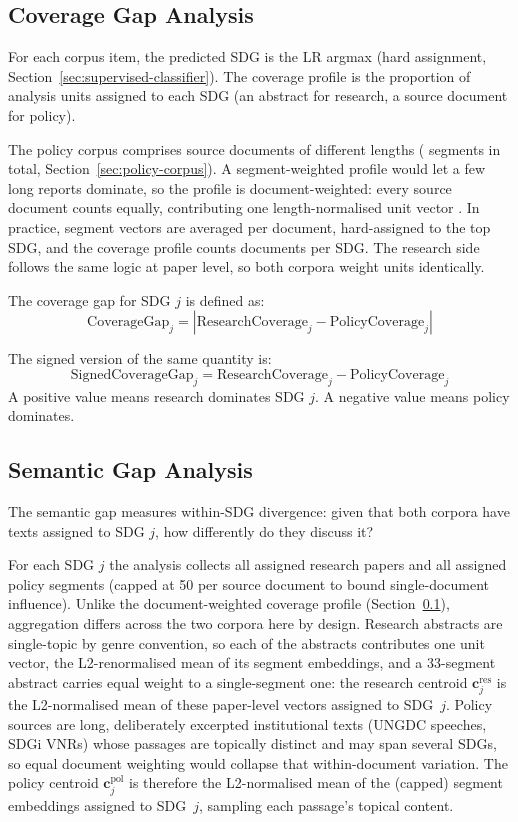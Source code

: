 \documentclass[12pt,a4paper]{article}
\begin{document}
\subsection{Coverage Gap Analysis}\label{sec:coverage-gap-method}

For each corpus item, the predicted SDG is the LR argmax (hard assignment, Section~\ref{sec:supervised-classifier}). The coverage profile is the proportion of analysis units assigned to each SDG (an abstract for research, a source document for policy).

The policy corpus comprises \NPolicyDocs{} source documents of different lengths (\NPolicySegments{} segments in total, Section~\ref{sec:policy-corpus}). A segment-weighted profile would let a few long reports dominate, so the profile is document-weighted: every source document counts equally, contributing one length-normalised unit vector \parencite{Manning2008}. In practice, segment vectors are averaged per document, hard-assigned to the top SDG, and the coverage profile counts documents per SDG. The research side follows the same logic at paper level, so both corpora weight units identically.

The coverage gap for SDG $j$ is defined as:
\[
  \text{CoverageGap}_j = \left|\text{ResearchCoverage}_j - \text{PolicyCoverage}_j\right|
\]

The signed version of the same quantity is:
\[
  \text{SignedCoverageGap}_j = \text{ResearchCoverage}_j - \text{PolicyCoverage}_j
\]
A positive value means research dominates SDG $j$. A negative value means policy dominates.

\subsection{Semantic Gap Analysis}\label{sec:semantic-gap-method}

The semantic gap measures within-SDG divergence: given that both corpora have texts assigned to SDG $j$, how differently do they discuss it?

For each SDG $j$ the analysis collects all assigned research papers and all assigned policy segments (capped at 50 per source document to bound single-document influence). Unlike the document-weighted coverage profile (Section~\ref{sec:coverage-gap-method}), aggregation differs across the two corpora here by design. Research abstracts are single-topic by genre convention, so each of the \NResearchAbstracts{} abstracts contributes one unit vector, the L2-renormalised mean of its segment embeddings, and a 33-segment abstract carries equal weight to a single-segment one: the research centroid $\mathbf{c}^{\text{res}}_j$ is the L2-normalised mean of these paper-level vectors assigned to SDG~$j$. Policy sources are long, deliberately excerpted institutional texts (UNGDC speeches, SDGi VNRs) whose passages are topically distinct and may span several SDGs, so equal document weighting would collapse that within-document variation. The policy centroid $\mathbf{c}^{\text{pol}}_j$ is therefore the L2-normalised mean of the (capped) segment embeddings assigned to SDG~$j$, sampling each passage's topical content.
\end{document}
